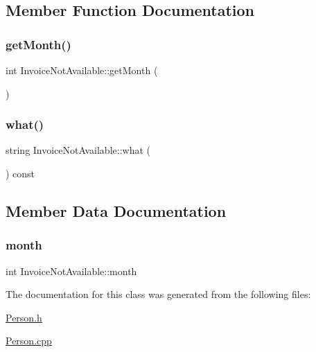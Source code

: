 \subsection{Member Function Documentation}
\mbox{\label{class_invoice_not_available_aba76622dae4202950c43956f6ed0930e}} 
\subsubsection{\texorpdfstring{get\+Month()}{getMonth()}}
{\footnotesize\ttfamily int Invoice\+Not\+Available\+::get\+Month (\begin{DoxyParamCaption}{ }\end{DoxyParamCaption})\hspace{0.3cm}{\ttfamily [inline]}}

\mbox{\label{class_invoice_not_available_a77e49a07e8605a37f1a4c6c59742b898}} 
\subsubsection{\texorpdfstring{what()}{what()}}
{\footnotesize\ttfamily string Invoice\+Not\+Available\+::what (\begin{DoxyParamCaption}{ }\end{DoxyParamCaption}) const}



\subsection{Member Data Documentation}
\mbox{\label{class_invoice_not_available_a35029f0aa54b16c927f45adbac81f427}} 
\subsubsection{\texorpdfstring{month}{month}}
{\footnotesize\ttfamily int Invoice\+Not\+Available\+::month}



The documentation for this class was generated from the following files\+:\begin{DoxyCompactItemize}
\item 
\mbox{\hyperlink{_person_8h}{Person.\+h}}\item 
\mbox{\hyperlink{_person_8cpp}{Person.\+cpp}}\end{DoxyCompactItemize}
